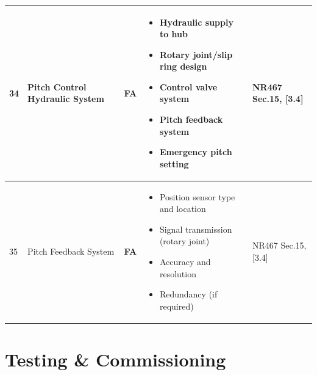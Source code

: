 \documentclass[11pt,a4paper]{report}
\newcommand{\fa}{\textbf{\textcolor{warningred}{FA}}}
\begin{document}
\begin{longtable}{|p{0.5cm}|p{5cm}|p{1.5cm}|p{5.5cm}|p{2cm}|}
34 & Pitch Control Hydraulic System & \fa{} & 
\begin{itemize}[leftmargin=*,nosep]
\item Hydraulic supply to hub
\item Rotary joint/slip ring design
\item Control valve system
\item Pitch feedback system
\item Emergency pitch setting
\end{itemize} & NR467 Sec.15, [3.4] \\
\hline

35 & Pitch Feedback System & \fa{} & 
\begin{itemize}[leftmargin=*,nosep]
\item Position sensor type and location
\item Signal transmission (rotary joint)
\item Accuracy and resolution
\item Redundancy (if required)
\end{itemize} & NR467 Sec.15, [3.4] \\
\hline

\end{longtable}

\section{Testing \& Commissioning}
\end{document}
